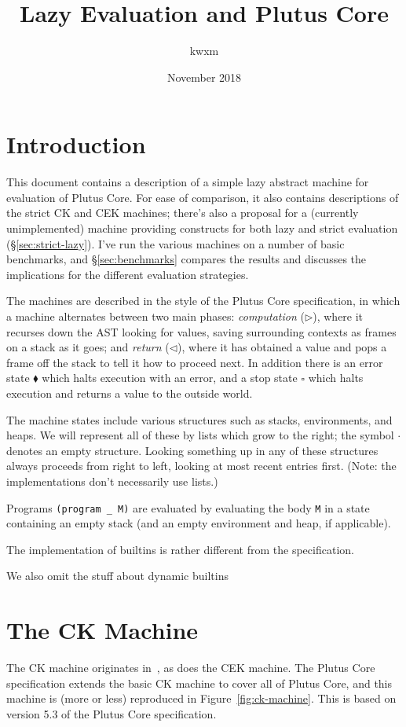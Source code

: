 \documentclass[a4paper]{article}
\author{kwxm}
\date{November 2018}
\title{Lazy Evaluation and Plutus Core}
\begin{document}
\maketitle
\section{Introduction}
This document contains a description of a simple lazy abstract machine
for evaluation of Plutus Core.  For ease of comparison, it also
contains descriptions of the strict CK and CEK machines; there's also
a proposal for a (currently unimplemented) machine providing
constructs for both lazy and strict evaluation
(\S\ref{sec:strict-lazy}).  I've run the various machines on a
number of basic benchmarks, and \S\ref{sec:benchmarks} compares
the results and discusses the implications for the different
evaluation strategies.

The machines are described in the style of the Plutus Core
specification, in which a machine alternates between two main phases:
\textit{computation} ($\triangleright$), where it recurses down the
AST looking for values, saving surrounding contexts as frames on a
stack as it goes; and \textit{return} ($\triangleleft$), where it has
obtained a value and pops a frame off the stack to tell it how to
proceed next.  In addition there is an error state $\blacklozenge$
which halts execution with an error, and a stop state $\square$ which
halts execution and returns a value to the outside world.

The machine states include various structures such as stacks,
environments, and heaps.  We will represent all of these by lists
which grow to the right; the symbol $\cdot$ denotes an empty
structure.  Looking something up in any of these structures always
proceeds from right to left, looking at most recent entries first.
(Note: the implementations don't necessarily use lists.)

Programs \texttt{(program \_ M)} are evaluated by evaluating the body
\texttt{M} in a state containing an empty stack (and an empty environment
and heap, if applicable).
 
The implementation of builtins is rather different from the specification.

We also omit the stuff about dynamic builtins


\newpage

\section{The CK Machine}
The CK machine originates in~\cite{Felleisen-Cek}, as does the CEK
machine.  The Plutus Core specification extends the basic CK machine
to cover all of Plutus Core, and this machine is (more or less)
reproduced in Figure~\ref{fig:ck-machine}.  This is based on version
5.3 of the Plutus Core specification.
\end{document}
